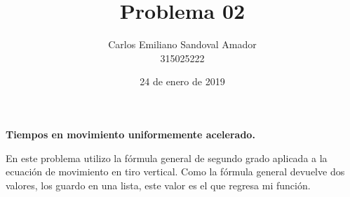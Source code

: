 \documentclass[letterpaper, 12pt, oneside]{article}%
\title{Problema 02}
\author{Carlos Emiliano Sandoval Amador \\ 315025222}
\date{24 de enero de 2019}
\begin{document}
	\maketitle
	\begin{center}
		\textbf{\large Tiempos en movimiento uniformemente acelerado.}
	\end{center}
	En este problema utilizo la fórmula general de segundo grado aplicada a la ecuación de movimiento en tiro vertical. Como la fórmula general devuelve dos valores, los guardo en una lista, este valor es el que regresa mi función.
\end{document}

